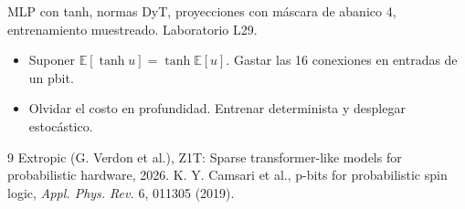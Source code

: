 \documentclass[11pt,a4paper]{article}
\begin{document}
\begin{aplicacion}
MLP con tanh, normas DyT, proyecciones con máscara de abanico 4, entrenamiento muestreado. Laboratorio L29.
\end{aplicacion}

\begin{error}
\begin{itemize}[nosep]
\item Suponer $\mathbb E[\tanh u]=\tanh\mathbb E[u]$. \quad Gastar las 16 conexiones en entradas de un pbit.
\item Olvidar el costo en profundidad. \quad Entrenar determinista y desplegar estocástico.
\end{itemize}
\end{error}

\begin{thebibliography}{9}\small
{} Extropic (G. Verdon et al.), Z1T: Sparse transformer-like models for probabilistic hardware, 2026.
 K. Y. Camsari et al., p-bits for probabilistic spin logic, \emph{Appl. Phys. Rev.} 6, 011305 (2019).
\end{thebibliography}
\end{document}
